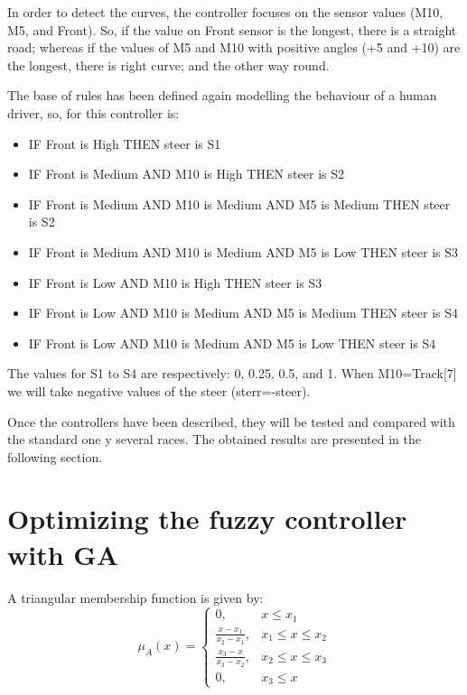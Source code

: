 \documentclass[runningheads,a4paper]{llncs}
\begin{document}
In order to detect the curves, the controller focuses on the sensor values (M10, M5, and Front). So, if the value on Front sensor is the longest, there is a straight road; whereas if the values of M5 and M10 with positive angles (+5 and +10) are the longest, there is right curve; and the other way round.

The base of rules has been defined again modelling the behaviour of a human driver, so, for this controller is:

\begin{itemize}		
	\item IF Front is High THEN steer is S1
	\item IF Front is Medium AND M10 is High THEN  steer is S2
	\item IF Front is Medium AND M10 is Medium AND M5 is Medium THEN steer is S2
	\item IF Front is Medium AND M10 is Medium AND M5 is Low THEN steer is S3
	\item IF Front is Low AND M10 is High THEN steer is S3
	\item IF Front is Low AND M10 is Medium AND M5 is Medium THEN steer is S4
	\item IF Front is Low AND M10 is Medium AND M5 is Low THEN steer is S4
\end{itemize}	

The values for S1 to S4 are respectively: 0, 0.25, 0.5, and 1.
When M10=Track[7] we will take negative values of the steer (sterr=-steer).

Once the controllers have been described, they will be tested and compared with the standard one y several races. The obtained results are presented in the following section.


	
\section{Optimizing the fuzzy controller with GA}

A triangular membership function is given by:
\begin{equation} 
\mu_{A}(x)= \left \{
\begin{array}{ll}
0, & x \leq x_{1}\\
\frac{x - x_{1}}{x_{2} - x_{1}}, &x_{1} \leq x \leq x_{2}  \\
\frac{x_{3} - x}{x_{3} - x_{2}}, &x_{2} \leq x \leq x_{3}  \\
0,& x_{3} \leq x 
\end{array}
\right.
\end{equation}
\end{document}
